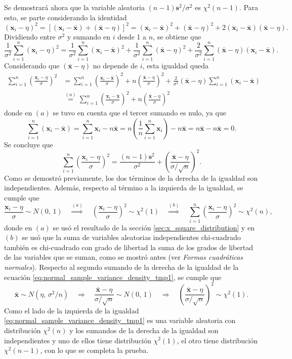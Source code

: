 \documentclass[a4paper]{report}
\newcommand{\x}{\mathbf{x}}
\begin{document}
Se demostrará ahora que la variable aleatoria \((n-1)\mathbf{s}^2/\sigma^2\) es \(\chi^2(n-1)\). Para esto, se parte considerando la identidad
\[
 (\x_i-\eta)^2=[(\x_i-\bar{\x})+(\bar{\x}-\eta)]^2=(\x_i-\bar{\x})^2+(\bar{\x}-\eta)^2+2(\x_i-\bar{\x})(\bar{\x}-\eta).
\]
Dividiendo entre \(\sigma^2\) y sumando en \(i\) desde 1 a \(n\), se obtiene que
\[
 \frac{1}{\sigma^2}\sum_{i=1}^n(\x_i-\eta)^2=\frac{1}{\sigma^2}\sum_{i=1}^n(\x_i-\bar{\x})^2+\frac{1}{\sigma^2}\sum_{i=1}^n(\bar{\x}-\eta)^2+\frac{2}{\sigma^2}\sum_{i=1}^n(\bar{\x}-\eta)(\x_i-\bar{\x}).
\]
Considerando que \((\bar{\x}-\eta)\) no depende de \(i\), esta igualdad queda
\begin{align*}
 \sum_{i=1}^n\left(\frac{\x_i-\eta}{\sigma}\right)^2&=\sum_{i=1}^n\left(\frac{\x_i-\bar{\x}}{\sigma}\right)^2+n\left(\frac{\bar{\x}-\eta}{\sigma}\right)^2+\frac{2}{\sigma^2}(\bar{\x}-\eta)\sum_{i=1}^n(\x_i-\bar{\x})\\
  &\overset{(a)}{=}\sum_{i=1}^n\left(\frac{\x_i-\bar{\x}}{\sigma}\right)^2+n\left(\frac{\bar{\x}-\eta}{\sigma}\right)^2
\end{align*}
donde en \((a)\) se tuvo en cuenta que el tercer sumando es nulo, ya que
\[
 \sum_{i=1}^n(\x_i-\bar{\x})=\sum_{i=1}^n\x_i-n\bar{\x}=n\left(\frac{1}{n}\sum_{i=1}^n\x_i\right)-n\bar{\x}=n\bar{\x}-n\bar{\x}=0.
\]
Se concluye que
\begin{equation}\label{eq:normal_sample_variance_density_tmp1}
 \sum_{i=1}^n\left(\frac{\x_i-\eta}{\sigma}\right)^2=\frac{(n-1)\mathbf{s}^2}{\sigma^2}+\left(\frac{\bar{\x}-\eta}{\sigma/\sqrt{n}}\right)^2.
\end{equation}
Como se demostró previamente, los dos términos de la derecha de la igualdad son independientes. Además, respecto al término a la izquierda de la igualdad, se cumple que
\[
 \frac{\x_i-\eta}{\sigma}\sim N(0,\,1) \quad \overset{(a)}{\Rightarrow} \quad 
 \left(\frac{\x_i-\eta}{\sigma}\right)^2\sim \chi^2(1) \quad \overset{(b)}{\Rightarrow} \quad 
 \sum_{i=1}^n\left(\frac{\x_i-\eta}{\sigma}\right)^2 \sim \chi^2(n),
\]
donde en \((a)\) se usó el resultado de la sección \ref{sec:x_square_distribution} y en \((b)\) se usó que la suma de variables aleatorias independientes chi-cuadrado también es chi-cuadrado con grado de libertad la suma de los grados de libertad de las variables que se suman, como se mostró antes (ver \emph{Formas cuadráticas normales}).
Respecto al segundo sumando de la derecha de la igualdad de la ecuación \ref{eq:normal_sample_variance_density_tmp1}, se cumple que
\[
 \bar{\x}\sim N(\eta,\,\sigma^2/n)\quad \Rightarrow \quad \frac{\bar{\x}-\eta}{\sigma/\sqrt{n}}\sim N(0,\,1) \quad \Rightarrow \quad \left(\frac{\bar{\x}-\eta}{\sigma/\sqrt{n}}\right)^2\sim\chi^2(1).
\]
Como el lado de la izquierda de la igualdad \ref{eq:normal_sample_variance_density_tmp1} es una variable aleatoria con distribución \(\chi^2(n)\) y los sumandos de la derecha de la igualdad son independientes y uno de ellos tiene distribución \(\chi^2(1)\), el otro tiene distribución \(\chi^2(n-1)\), con lo que se completa la prueba.
\end{document}
